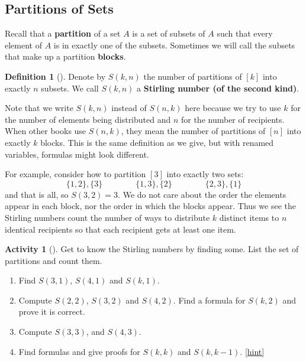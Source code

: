 \documentclass[10pt,]{book}
\newcommand{\terminology}[1]{\textbf{#1}}
\theoremstyle{plain}
\theoremstyle{definition}
\newtheorem{definition}[theorem]{Definition}
\theoremstyle{definition}
\theoremstyle{definition}
\newtheorem{activity}[project]{Activity}
\numberwithin{equation}{chapter}
\begin{document}
\subsection[{Partitions of Sets}]{Partitions of Sets}\label{subsection-24}
\hypertarget{p-1073}{}%
Recall that a \terminology{partition} of a set \(A\) is a set of subsets of \(A\) such that every element of \(A\) is in exactly one of the subsets.  Sometimes we will call the subsets that make up a partition \terminology{blocks}.%
\begin{definition}[{}]\label{def-stirling}
\hypertarget{p-1074}{}%
Denote by \(S(k,n)\) the number of partitions of \([k]\) into exactly \(n\) subsets.  We call \(S(k,n)\) a \terminology{Stirling number (of the second kind)}.%
\end{definition}
\hypertarget{p-1075}{}%
Note that we write \(S(k,n)\) instead of \(S(n,k)\) here because we try to use \(k\) for the number of elements being distributed and \(n\) for the number of recipients.  When other books use \(S(n,k)\), they mean the number of partitions of \([n]\) into exactly \(k\) blocks.  This is the same definition as we give, but with renamed variables, formulas might look different.%
\par
\hypertarget{p-1076}{}%
For example, consider how to partition \([3]\) into exactly two sets:%
\begin{equation*}
\{1,2\}, \{3\} \qquad \qquad \{1,3\},\{2\} \qquad \qquad \{2,3\},\{1\}
\end{equation*}
and that is all, so \(S(3,2) = 3\).  We do not care about the order the elements appear in each block, nor the order in which the blocks appear.  Thus we see the Stirling numbers count the number of ways to distribute \(k\) distinct items to \(n\) identical recipients so that each recipient gets at least one item.%
\begin{activity}[]\label{act_stirlingcomputations}
\hypertarget{p-1077}{}%
Get to know the Stirling numbers by finding some.  List the set of partitions and count them.%
\begin{enumerate}[font=\bfseries,label=(\alph*),ref=\alph*]
\item\label{task-207} \hypertarget{p-1078}{}%
Find \(S(3,1)\), \(S(4,1)\) and \(S(k,1)\).%
\item\label{task-208} \hypertarget{p-1079}{}%
Compute \(S(2,2)\), \(S(3,2)\) and \(S(4,2)\).  Find a formula for \(S(k,2)\) and prove it is correct.%
\item\label{task-209} \hypertarget{p-1080}{}%
Compute \(S(3,3)\), and \(S(4,3)\).%
\item\label{task-210} \hypertarget{p-1081}{}%
Find formulas and give proofs for \(S(k,k)\) and \(S(k,k - 1)\).%
\hfill{\tiny\hyperlink{a-198.d}{[hint]}\hypertarget{q-198.d}{}}\end{enumerate}
\end{activity}
\end{document}
